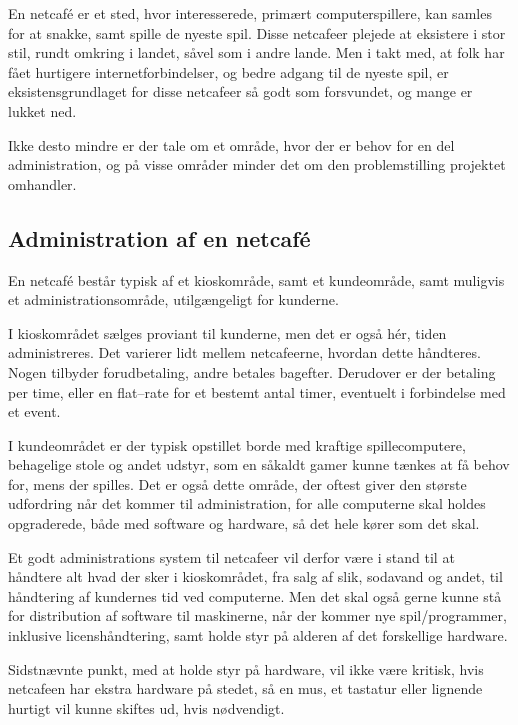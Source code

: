 En netcafé er et sted, hvor interesserede, primært computerspillere, kan samles for at snakke, samt spille de
nyeste spil. Disse netcafeer plejede at eksistere i stor stil, rundt omkring i landet, såvel som i andre
lande. Men i takt med, at folk har fået hurtigere internetforbindelser, og bedre adgang til de nyeste spil, er
eksistensgrundlaget for disse netcafeer så godt som forsvundet, og mange er lukket ned.

Ikke desto mindre er der tale om et område, hvor der er behov for en del administration, og på visse områder
minder det om den problemstilling projektet omhandler.


\subsection{Administration af en netcafé}\label{sec:administration-af-en-netcafe}

En netcafé består typisk af et kioskområde, samt et kundeområde, samt muligvis et administrationsområde,
utilgængeligt for kunderne.

I kioskområdet sælges proviant til kunderne, men det er også hér, tiden administreres. Det varierer lidt
mellem netcafeerne, hvordan dette håndteres. Nogen tilbyder forudbetaling, andre betales bagefter. Derudover
er der betaling per time, eller en flat--rate for et bestemt antal timer, eventuelt i forbindelse med et
event.

I kundeområdet er der typisk opstillet borde med kraftige spillecomputere, behagelige stole og andet udstyr,
som en såkaldt gamer kunne tænkes at få behov for, mens der spilles. Det er også dette område, der oftest
giver den største udfordring når det kommer til administration, for alle computerne skal holdes opgraderede,
både med software og hardware, så det hele kører som det skal.

Et godt administrations system til netcafeer vil derfor være i stand til at håndtere alt hvad der sker i
kioskområdet, fra salg af slik, sodavand og andet, til håndtering af kundernes tid ved computerne. Men det
skal også gerne kunne stå for distribution af software til maskinerne, når der kommer nye spil/programmer,
inklusive licenshåndtering, samt holde styr på alderen af det forskellige hardware.

Sidstnævnte punkt, med at holde styr på hardware, vil ikke være kritisk, hvis netcafeen har ekstra hardware på
stedet, så en mus, et tastatur eller lignende hurtigt vil kunne skiftes ud, hvis nødvendigt.


